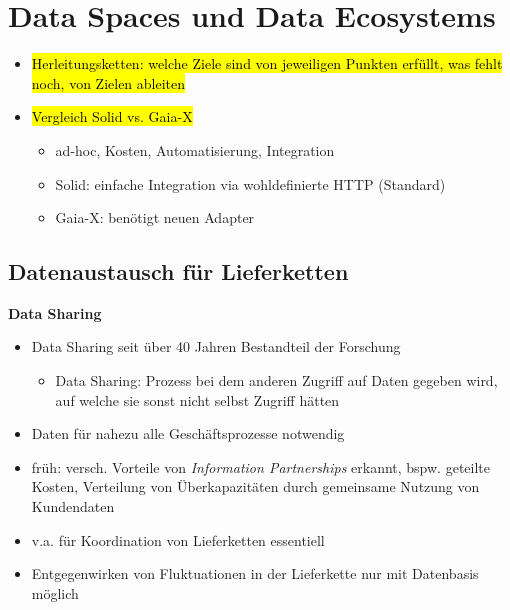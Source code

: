 
\section{Data Spaces und Data Ecosystems}

\begin{itemize}
    \item \hl{Herleitungsketten: welche Ziele sind von jeweiligen Punkten erfüllt, was fehlt noch, von Zielen ableiten}
    \item \hl{Vergleich Solid vs. Gaia-X}
    \begin{itemize}
        \item ad-hoc, Kosten, Automatisierung, Integration
        \item Solid: einfache Integration via wohldefinierte HTTP (Standard)
        \item Gaia-X: benötigt neuen Adapter
    \end{itemize}
\end{itemize}


\subsection{Datenaustausch für Lieferketten}

\textbf{Data Sharing}
\begin{itemize}
    \item Data Sharing seit über 40 Jahren Bestandteil der Forschung
    \begin{itemize}
        \item Data Sharing: Prozess bei dem anderen Zugriff auf Daten gegeben wird, auf welche sie sonst nicht selbst Zugriff hätten
    \end{itemize}
    \item Daten für nahezu alle Geschäftsprozesse notwendig
    \item früh: versch. Vorteile von \emph{Information Partnerships} erkannt, bspw. geteilte Kosten, Verteilung von Überkapazitäten durch gemeinsame Nutzung von Kundendaten
    \item v.a. für Koordination von Lieferketten essentiell
    \item Entgegenwirken von Fluktuationen in der Lieferkette nur mit Datenbasis möglich~\cite{mollerIndustrialDataEcosystems2024}
\end{itemize}

